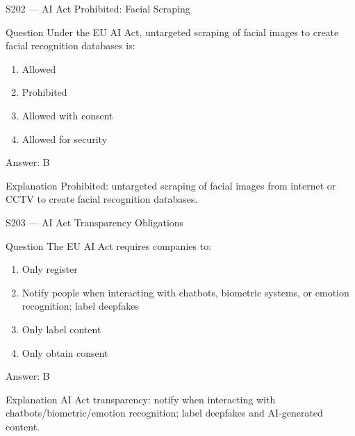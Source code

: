 \documentclass[aspectratio=169,8pt]{beamer}
\begin{document}
\begin{frame}{S202 --- AI Act Prohibited: Facial Scraping}
	\begin{block}{Question}
		Under the EU AI Act, untargeted scraping of facial images to create facial recognition databases is:
		\begin{enumerate}
			\item Allowed
			\item Prohibited
			\item Allowed with consent
			\item Allowed for security
		\end{enumerate}
	\end{block}
	\begin{exampleblock}{Answer: B}\end{exampleblock}
	\begin{block}{Explanation}
		Prohibited: untargeted scraping of facial images from internet or CCTV to create facial recognition databases.
	\end{block}
\end{frame}

\begin{frame}{S203 --- AI Act Transparency Obligations}
	\begin{block}{Question}
		The EU AI Act requires companies to:
		\begin{enumerate}
			\item Only register
			\item Notify people when interacting with chatbots, biometric systems, or emotion recognition; label deepfakes
			\item Only label content
			\item Only obtain consent
		\end{enumerate}
	\end{block}
	\begin{exampleblock}{Answer: B}\end{exampleblock}
	\begin{block}{Explanation}
		AI Act transparency: notify when interacting with chatbots/biometric/emotion recognition; label deepfakes and AI-generated content.
	\end{block}
\end{frame}
\end{document}

